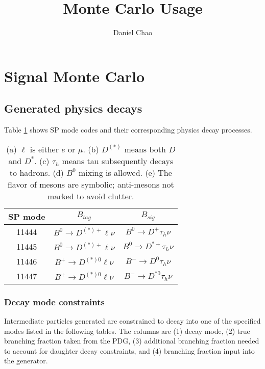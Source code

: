 \documentclass{article}
\title{Monte Carlo Usage}
\author{Daniel Chao}
\date{ }
\renewcommand{\(}{\left(}
\renewcommand{\)}{\right)}
\numberwithin{equation}{section}
\begin{document}
\maketitle 
\tableofcontents 

\section{Signal Monte Carlo}
\subsection{Generated physics decays}
Table \ref{sigmc_spmodes} shows SP mode codes and their corresponding physics decay processes. 
\begin{table}[H]
  \begin{center}
    \begin{tabular}{ c c c }
      SP mode & $B_{tag}$ & $B_{sig}$ \\
      \hline\hline
      11444 & $B^0\rightarrow D^{(*)+}\ell\nu$ & $B^0\rightarrow D^+\tau_h\nu$ \\
      \hline
      11445 & $B^0\rightarrow D^{(*)+}\ell\nu$ & $B^0\rightarrow D^{*+}\tau_h\nu$ \\
      \hline
      11446 & $B^+\rightarrow D^{(*)0}\ell\nu$ & $B^-\rightarrow D^{0}\tau_h\nu$ \\
      \hline
      11447 & $B^+\rightarrow D^{(*)0}\ell\nu$ & $B^-\rightarrow D^{*0}\tau_h\nu$ \\
      \hline
    \end{tabular}
  \end{center}
  \caption{(a) $\ell$ is either $e$ or $\mu$. (b) $D^{(*)}$ means both $D$ and $D^*$. (c) $\tau_h$ means tau subsequently decays to hadrons. (d) $B^0$ mixing is allowed. (e) The flavor of mesons are symbolic; anti-mesons not marked to avoid clutter.}
  \label{sigmc_spmodes}
\end{table}

\subsubsection{Decay mode constraints}
Intermediate particles generated are constrained to decay into one of the specified modes listed in the following tables. The columns are (1) decay mode, (2) true branching fraction taken from the PDG, (3) additional branching fraction needed to account for daughter decay constraints, and (4) branching fraction input into the generator. 
\end{document}
